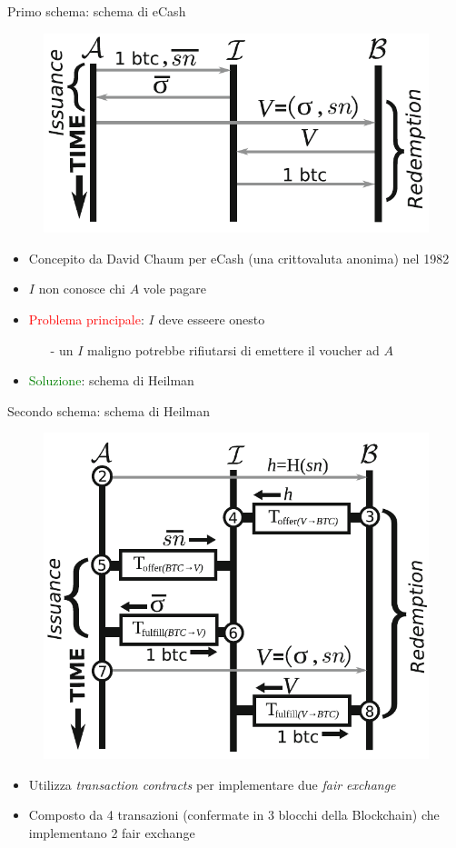 \documentclass{beamer}
\newcommand\red[1]{\textcolor{red}{#1}}
\begin{document}
  \begin{frame}{Primo schema: schema di eCash}
      \begin{figure}
          \centering
          \includegraphics[width=0.6\linewidth]{../img/eCash-scheme.png}
      \end{figure}
      \begin{itemize}
          \item Concepito da David Chaum per eCash (una crittovaluta anonima) nel 1982 \cite{chaum1982blind}
          \item $I$ non conosce chi $A$ vole pagare \pause
          \item \red{Problema principale}: $I$ deve esseere onesto
          \begin{itemize}
              \item[-] un $I$ maligno potrebbe rifiutarsi di emettere il voucher ad $A$
          \end{itemize}
          \pause
          \item \textcolor{green}{Soluzione}: schema di Heilman \cite{heilman-blindly-signed-contracts}
      \end{itemize}
  \end{frame}
  
  
  
  
  \begin{frame}{Secondo schema: schema di Heilman}
      \begin{figure}
          \centering
          \includegraphics[width=0.4\linewidth]{../img/heilman-scheme.png}
      \end{figure}
      \begin{itemize}
          \item Utilizza \emph{transaction contracts} per implementare due \emph{fair exchange}
          \item Composto da 4 transazioni (confermate in 3 blocchi della Blockchain) che implementano 2 fair exchange
      \end{itemize}
  \end{frame}
  
\end{document}
